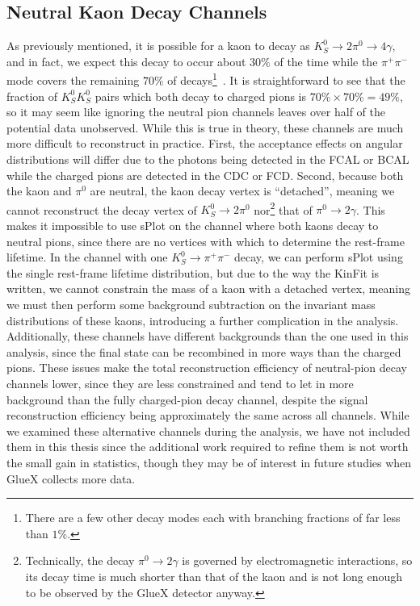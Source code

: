 \subsection{Neutral Kaon Decay Channels}\label{sub:neutral-kaon-decay-channels}
As previously mentioned, it is possible for a kaon to decay as $K_S^0 \to 2\pi^0 \to 4\gamma$, and in fact, we expect this decay to occur about $30\%$ of the time while the $\pi^+\pi^-$ mode covers the remaining $70\%$ of decays\footnote{There are a few other decay modes each with branching fractions of far less than $1\%$.}~\cite{Zyla2020}. It is straightforward to see that the fraction of $K_S^0 K_S^0$ pairs which both decay to charged pions is $70\%\times 70\%=49\%$, so it may seem like ignoring the neutral pion channels leaves over half of the potential data unobserved. While this is true in theory, these channels are much more difficult to reconstruct in practice. First, the acceptance effects on angular distributions will differ due to the photons being detected in the FCAL or BCAL while the charged pions are detected in the CDC or FCD. Second, because both the kaon and $\pi^0$ are neutral, the kaon decay vertex is ``detached'', meaning we cannot reconstruct the decay vertex of $K_S^0 \to 2\pi^0$ nor\footnote{Technically, the decay $\pi^0 \to 2\gamma$ is governed by electromagnetic interactions, so its decay time is much shorter than that of the kaon and is not long enough to be observed by the GlueX detector anyway.} that of $\pi^0 \to 2\gamma$. This makes it impossible to use sPlot on the channel where both kaons decay to neutral pions, since there are no vertices with which to determine the rest-frame lifetime. In the channel with one $K_S^0\to\pi^+\pi^-$ decay, we can perform sPlot using the single rest-frame lifetime distribution, but due to the way the KinFit is written, we cannot constrain the mass of a kaon with a detached vertex, meaning we must then perform some background subtraction on the invariant mass distributions of these kaons, introducing a further complication in the analysis. Additionally, these channels have different backgrounds than the one used in this analysis, since the final state can be recombined in more ways than the charged pions. These issues make the total reconstruction efficiency of neutral-pion decay channels lower, since they are less constrained and tend to let in more background than the fully charged-pion decay channel, despite the signal reconstruction efficiency being approximately the same across all channels. While we examined these alternative channels during the analysis, we have not included them in this thesis since the additional work required to refine them is not worth the small gain in statistics, though they may be of interest in future studies when GlueX collects more data.

